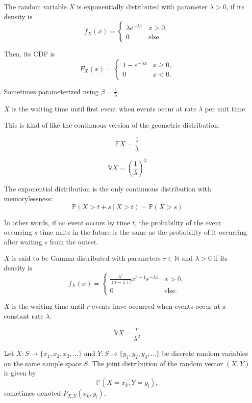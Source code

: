 \documentclass{article}
\begin{document}
\medskip
{}

    The random variable $X$ is exponentially distributed with parameter $\lambda > 0$, if its density is $$f_X(x) = \begin{cases} \lambda e^{-\lambda x} & x > 0, \\ 0 & \text{else.} \end{cases}$$
    
    Then, its CDF is $$F_X(x) = \begin{cases} 1 - e^{-\lambda x} & x \geq 0, \\ 0 & x < 0. \end{cases}$$
    
    Sometimes parameterized using $\beta = \frac1\lambda$.
    
    $X$ is the waiting time until first event when events occur at rate $\lambda$ per unit time.
    
    This is kind of like the continuous version of the geometric distribution.
    
    $$\mathbb EX = \frac1\lambda$$

    $$\mathbb VX = \left(\frac1\lambda\right)^2$$
    
    The exponential distribution is the only continuous distribution with memorylessness: 
    $$\mathbb P(X > t + s~|~X > t) = \mathbb P(X > s)$$
    
    In other words, if no event occurs by time $t$, the probability of the event occurring $s$ time units in the future is the same as the probability of it occurring after waiting $s$ from the outset. 

\medskip
{}

    $X$ is said to be Gamma distributed with parameters $r \in \mathbb N$ and $\lambda > 0$ if its density is $$f_X(x) = \begin{cases} \frac{\lambda^r}{(r-1)!}x^{r-1}e^{-\lambda x} & x > 0, \\ 0 & \text{else.} \end{cases}$$

    $X$ is the waiting time until $r$ events have occurred when events occur at a constant rate $\lambda$.

    
    $$\mathbb VX = \frac r {\lambda^2}$$
    
\medskip
{}

    Let $X: S \to \{x_1, x_2, x_3, \hdots\}$ and $Y: S \to \{y_1, y_2, y_3, \hdots\}$ be discrete random variables on the same sample space $S$. The joint distribution of the random vector $(X, Y)$ is given by $$\mathbb P(X = x_k, Y=y_l),$$ sometimes denoted $P_{X,Y}(x_k,y_l)$.
    
\end{document}
